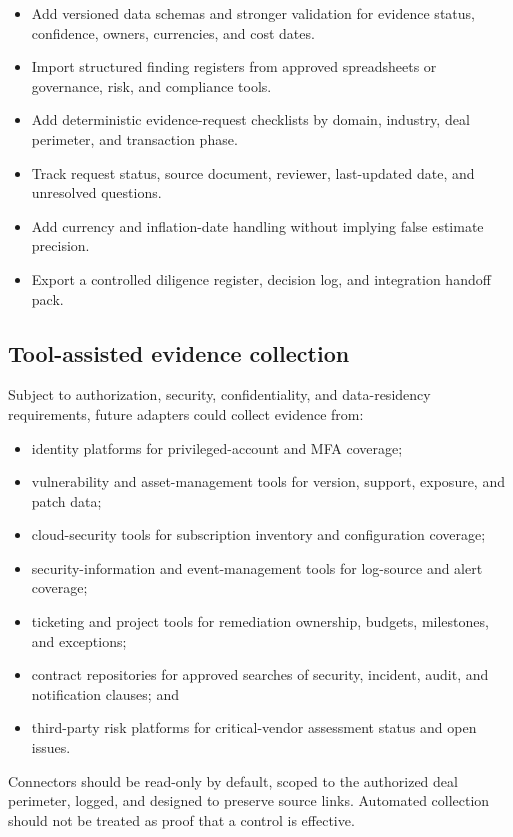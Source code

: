 \documentclass[11pt,a4paper]{article}
\begin{document}
\begin{itemize}
  \item Add versioned data schemas and stronger validation for evidence status, confidence, owners, currencies, and cost dates.
  \item Import structured finding registers from approved spreadsheets or governance, risk, and compliance tools.
  \item Add deterministic evidence-request checklists by domain, industry, deal perimeter, and transaction phase.
  \item Track request status, source document, reviewer, last-updated date, and unresolved questions.
  \item Add currency and inflation-date handling without implying false estimate precision.
  \item Export a controlled diligence register, decision log, and integration handoff pack.
\end{itemize}

\subsection{Tool-assisted evidence collection}

Subject to authorization, security, confidentiality, and data-residency requirements, future adapters could collect evidence from:

\begin{itemize}
  \item identity platforms for privileged-account and MFA coverage;
  \item vulnerability and asset-management tools for version, support, exposure, and patch data;
  \item cloud-security tools for subscription inventory and configuration coverage;
  \item security-information and event-management tools for log-source and alert coverage;
  \item ticketing and project tools for remediation ownership, budgets, milestones, and exceptions;
  \item contract repositories for approved searches of security, incident, audit, and notification clauses; and
  \item third-party risk platforms for critical-vendor assessment status and open issues.
\end{itemize}

Connectors should be read-only by default, scoped to the authorized deal perimeter, logged, and designed to preserve source links. Automated collection should not be treated as proof that a control is effective.
\end{document}
